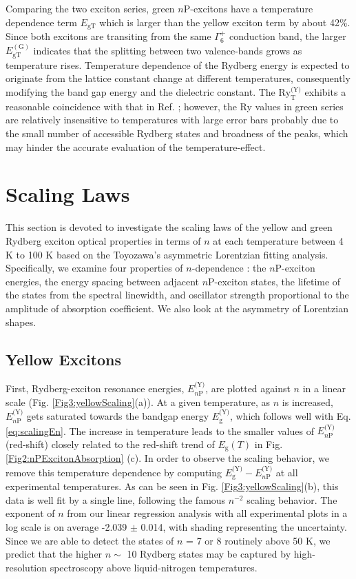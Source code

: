 \documentclass[aps,reprint,amsmath,amssymb,prb]{revtex4-1}
\begin{document}
Comparing the two exciton series, green $n$P-excitons have a temperature dependence term $E_{\textrm{gT}}$ which is larger than the yellow exciton term by about 42\%. Since both excitons are transiting from the same  $\Gamma_6^+$ conduction band, the larger $E_{\textrm{gT}}^{(\text{G})}$ indicates that the splitting between two valence-bands grows as temperature rises. Temperature dependence of the Rydberg energy is expected to originate from the lattice constant change at different temperatures, consequently modifying the band gap energy and the dielectric constant. The $\text{Ry}_\textrm{T}^{\text{(Y)}}$ exhibits a reasonable coincidence with that in Ref. \cite{Itoh1975}; however, the Ry values in green series are relatively insensitive to temperatures with large error bars probably due to the small number of accessible Rydberg states and broadness of the peaks, which may hinder the accurate evaluation of the temperature-effect.

\section{Scaling Laws}

This section is devoted to investigate the scaling laws of the yellow and green Rydberg exciton optical properties in terms of $n$ at each temperature between 4 K to 100 K based on the Toyozawa's asymmetric Lorentzian fitting analysis. Specifically, we examine four properties of $n$-dependence : the $n$P-exciton energies, the energy spacing between adjacent $n$P-exciton states, the lifetime of the states from the spectral linewidth, and oscillator strength proportional to the amplitude of absorption coefficient. We also look at the asymmetry of Lorentzian shapes. 

\subsection {Yellow Excitons}

First, Rydberg-exciton resonance energies, $E_{n\text{P}}^{\text{(Y)}}$, are plotted against $n$ in a linear scale (Fig. \ref{Fig3:yellowScaling}(a)). At a given temperature, as $n$ is increased, $E_{n\text{P}}^{\text{(Y)}}$ gets saturated towards the bandgap energy $E_{\text{g}}^{\text{(Y)}}$, which follows well with Eq. \ref{eq:scalingEn}. The increase in temperature leads to the smaller values of $E_{n\text{P}}^{\text{(Y)}}$ (red-shift) closely related to the red-shift trend of $E_{\text{g}}(T)$ in Fig. \ref{Fig2:nPExcitonAbsorption} (c). In order to observe the scaling behavior, we remove this temperature dependence by computing $E_{\text{g}}^{\text{(Y)}} - E_{n\text{P}}^{\text{(Y)}}$ at all experimental temperatures. As can be seen in Fig. \ref{Fig3:yellowScaling}(b), this data is well fit by a single line, following the famous $n^{-2}$ scaling behavior. The exponent of $n$ from our linear regression analysis with all experimental plots in a log scale is on average -2.039 $\pm$ 0.014, with shading representing the uncertainty. Since we are able to detect the states of $n$ = 7 or 8 routinely above 50 K, we predict that the higher $n \sim$ 10 Rydberg states may be captured by high-resolution spectroscopy above liquid-nitrogen temperatures.  
\end{document}
